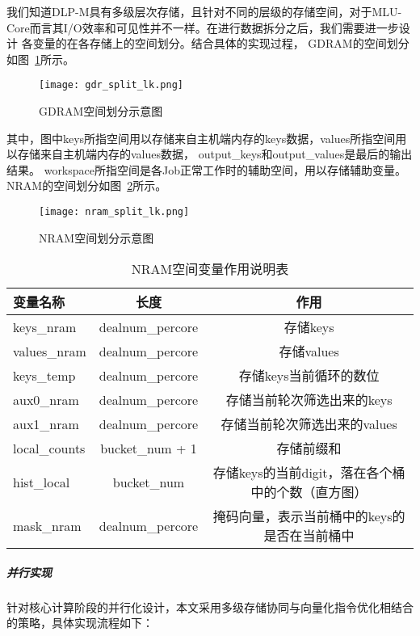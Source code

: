 我们知道DLP-M具有多级层次存储，且针对不同的层级的存储空间，对于MLU-Core而言其I/O效率和可见性并不一样。在进行数据拆分之后，我们需要进一步设计
各变量的在各存储上的空间划分。结合具体的实现过程，
GDRAM的空间划分如图~\ref{fig:gdr_split_lk}所示。

\begin{figure}[ht]
    \centering
    \texttt{[image: gdr\_split\_lk.png]}
    \caption{GDRAM空间划分示意图}
    \label{fig:gdr_split_lk}
\end{figure}
其中，图中keys所指空间用以存储来自主机端内存的keys数据，values所指空间用以存储来自主机端内存的values数据，
output\_keys和output\_values是最后的输出结果。
workspace所指空间是各Job正常工作时的辅助空间，用以存储辅助变量。
NRAM的空间划分如图~\ref{fig:nram_split_lk}所示。

\begin{figure}[ht]
    \centering
    \texttt{[image: nram\_split\_lk.png]}
    \caption{NRAM空间划分示意图}
    \label{fig:nram_split_lk}
\end{figure}


\begin{table}
    \caption{NRAM空间变量作用说明表}
    \centering
    \begin{tabular}{lcc}
    \toprule
    变量名称 & 长度 & 作用 \\
    \midrule
    keys\_nram & dealnum\_percore & 存储keys \\
    values\_nram & dealnum\_percore & 存储values \\
    keys\_temp & dealnum\_percore & 存储keys当前循环的数位 \\
    aux0\_nram & dealnum\_percore & 存储当前轮次筛选出来的keys \\
    aux1\_nram & dealnum\_percore &  存储当前轮次筛选出来的values\\
    local\_counts & bucket\_num + 1 & 存储前缀和 \\
    hist\_local & bucket\_num & 存储keys的当前digit，落在各个桶中的个数（直方图） \\
    mask\_nram & dealnum\_percore & 掩码向量，表示当前桶中的keys的是否在当前桶中 \\
    \bottomrule
    \end{tabular}
    \label{tab:nram_var}
\end{table}

\subparagraph{并行实现}
针对核心计算阶段的并行化设计，本文采用多级存储协同与向量化指令优化相结合的策略，具体实现流程如下：

